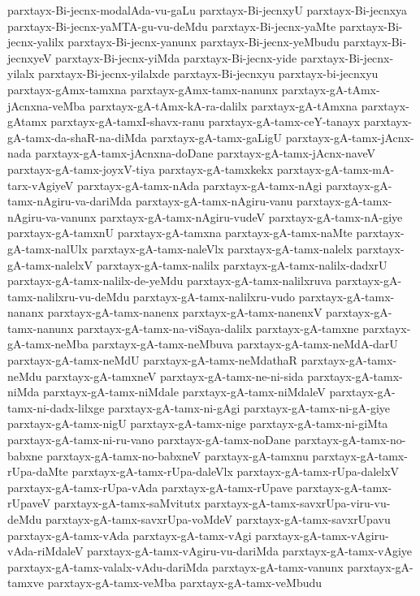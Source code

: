 {parxtayx-Bi-jecnx-modalAda-vu-gaLu
parxtayx-Bi-jecnxyU
parxtayx-Bi-jecnxya
parxtayx-Bi-jecnx-yaMTA-gu-vu-deMdu
parxtayx-Bi-jecnx-yaMte
parxtayx-Bi-jecnx-yalilx
parxtayx-Bi-jecnx-yanunx
parxtayx-Bi-jecnx-yeMbudu
parxtayx-Bi-jecnxyeV
parxtayx-Bi-jecnx-yiMda
parxtayx-Bi-jecnx-yide
parxtayx-Bi-jecnx-yilalx
parxtayx-Bi-jecnx-yilalxde
parxtayx-Bi-jecnxyu
parxtayx-bi-jecnxyu
parxtayx-gAmx-tamxna
parxtayx-gAmx-tamx-nanunx
parxtayx-gA-tAmx-jAcnxna-veMba
parxtayx-gA-tAmx-kA-ra-dalilx
parxtayx-gA-tAmxna
parxtayx-gAtamx
parxtayx-gA-tamxI-shavx-ranu
parxtayx-gA-tamx-ceY-tanayx
parxtayx-gA-tamx-da-shaR-na-diMda
parxtayx-gA-tamx-gaLigU
parxtayx-gA-tamx-jAcnx-nada
parxtayx-gA-tamx-jAcnxna-doDane
parxtayx-gA-tamx-jAcnx-naveV
parxtayx-gA-tamx-joyxV-tiya
parxtayx-gA-tamxkekx
parxtayx-gA-tamx-mA-tarx-vAgiyeV
parxtayx-gA-tamx-nAda
parxtayx-gA-tamx-nAgi
parxtayx-gA-tamx-nAgiru-va-dariMda
parxtayx-gA-tamx-nAgiru-vanu
parxtayx-gA-tamx-nAgiru-va-vanunx
parxtayx-gA-tamx-nAgiru-vudeV
parxtayx-gA-tamx-nA-giye
parxtayx-gA-tamxnU
parxtayx-gA-tamxna
parxtayx-gA-tamx-naMte
parxtayx-gA-tamx-nalUlx
parxtayx-gA-tamx-naleVlx
parxtayx-gA-tamx-nalelx
parxtayx-gA-tamx-nalelxV
parxtayx-gA-tamx-nalilx
parxtayx-gA-tamx-nalilx-dadxrU
parxtayx-gA-tamx-nalilx-de-yeMdu
parxtayx-gA-tamx-nalilxruva
parxtayx-gA-tamx-nalilxru-vu-deMdu
parxtayx-gA-tamx-nalilxru-vudo
parxtayx-gA-tamx-nananx
parxtayx-gA-tamx-nanenx
parxtayx-gA-tamx-nanenxV
parxtayx-gA-tamx-nanunx
parxtayx-gA-tamx-na-viSaya-dalilx
parxtayx-gA-tamxne
parxtayx-gA-tamx-neMba
parxtayx-gA-tamx-neMbuva
parxtayx-gA-tamx-neMdA-darU
parxtayx-gA-tamx-neMdU
parxtayx-gA-tamx-neMdathaR
parxtayx-gA-tamx-neMdu
parxtayx-gA-tamxneV
parxtayx-gA-tamx-ne-ni-sida
parxtayx-gA-tamx-niMda
parxtayx-gA-tamx-niMdale
parxtayx-gA-tamx-niMdaleV
parxtayx-gA-tamx-ni-dadx-lilxge
parxtayx-gA-tamx-ni-gAgi
parxtayx-gA-tamx-ni-gA-giye
parxtayx-gA-tamx-nigU
parxtayx-gA-tamx-nige
parxtayx-gA-tamx-ni-giMta
parxtayx-gA-tamx-ni-ru-vano
parxtayx-gA-tamx-noDane
parxtayx-gA-tamx-no-babxne
parxtayx-gA-tamx-no-babxneV
parxtayx-gA-tamxnu
parxtayx-gA-tamx-rUpa-daMte
parxtayx-gA-tamx-rUpa-daleVlx
parxtayx-gA-tamx-rUpa-dalelxV
parxtayx-gA-tamx-rUpa-vAda
parxtayx-gA-tamx-rUpave
parxtayx-gA-tamx-rUpaveV
parxtayx-gA-tamx-saMvitutx
parxtayx-gA-tamx-savxrUpa-viru-vu-deMdu
parxtayx-gA-tamx-savxrUpa-voMdeV
parxtayx-gA-tamx-savxrUpavu
parxtayx-gA-tamx-vAda
parxtayx-gA-tamx-vAgi
parxtayx-gA-tamx-vAgiru-vAda-riMdaleV
parxtayx-gA-tamx-vAgiru-vu-dariMda
parxtayx-gA-tamx-vAgiye
parxtayx-gA-tamx-valalx-vAdu-dariMda
parxtayx-gA-tamx-vanunx
parxtayx-gA-tamxve
parxtayx-gA-tamx-veMba
parxtayx-gA-tamx-veMbudu
}
